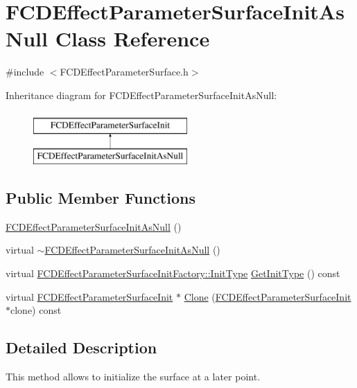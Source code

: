 \hypertarget{classFCDEffectParameterSurfaceInitAsNull}{
\section{FCDEffectParameterSurfaceInitAsNull Class Reference}
\label{classFCDEffectParameterSurfaceInitAsNull}
}


{\ttfamily \#include $<$FCDEffectParameterSurface.h$>$}

Inheritance diagram for FCDEffectParameterSurfaceInitAsNull:\begin{figure}[H]
\begin{center}
\leavevmode
\includegraphics[height=2.000000cm]{classFCDEffectParameterSurfaceInitAsNull}
\end{center}
\end{figure}
\subsection*{Public Member Functions}
\begin{DoxyCompactItemize}
\item 
\hyperlink{classFCDEffectParameterSurfaceInitAsNull_ad1abc61479cb8ba4bf4f5038513fd763}{FCDEffectParameterSurfaceInitAsNull} ()
\item 
virtual \hyperlink{classFCDEffectParameterSurfaceInitAsNull_ab427055c5f1197f5b42e4b3ac22dfb44}{$\sim$FCDEffectParameterSurfaceInitAsNull} ()
\item 
virtual \hyperlink{classFCDEffectParameterSurfaceInitFactory_a65e74f1159865702cac5236dd5d83892}{FCDEffectParameterSurfaceInitFactory::InitType} \hyperlink{classFCDEffectParameterSurfaceInitAsNull_a91211f6657b5ca23ad0530fe803eea8b}{GetInitType} () const 
\item 
virtual \hyperlink{classFCDEffectParameterSurfaceInit}{FCDEffectParameterSurfaceInit} $\ast$ \hyperlink{classFCDEffectParameterSurfaceInitAsNull_a0c3b98b0d3d379c6cab95c45490ee579}{Clone} (\hyperlink{classFCDEffectParameterSurfaceInit}{FCDEffectParameterSurfaceInit} $\ast$clone) const 
\end{DoxyCompactItemize}


\subsection{Detailed Description}
This method allows to initialize the surface at a later point. 

